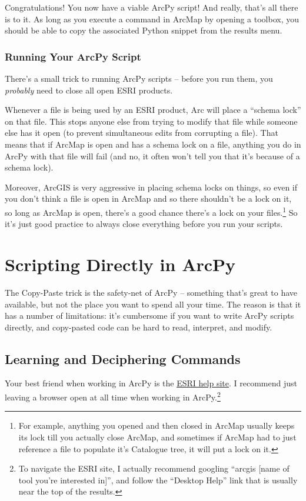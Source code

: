 \documentclass[12pt]{article}
\begin{document}
Congratulations! You now have a viable ArcPy script! And really, that's all there is to it. As long as you execute a command in ArcMap by opening a toolbox, you should be able to copy the associated Python snippet from the results menu. 

\subsubsection*{Running Your ArcPy Script}
There's a small trick to running ArcPy scripts -- before you run them, you \emph{probably} need to close all open ESRI products. 

Whenever a file is being used by an ESRI product, Arc will place a ``schema lock'' on that file. This stops anyone else from trying to modify that file while someone else has it open (to prevent simultaneous edits from corrupting a file). That means that if ArcMap is open and has a schema lock on a file, anything you do in ArcPy with that file will fail (and no, it often won't tell you that it's because of a schema lock).

Moreover, ArcGIS is very aggressive in placing schema locks on things, so even if you don't think a file is open in ArcMap and so there shouldn't be a lock on it, so long as ArcMap is open, there's a good chance there's a lock on your files.\footnote{For example, anything you opened and then closed in ArcMap usually keeps its lock till you actually close ArcMap, and sometimes if ArcMap had to just reference a file to populate it's Catalogue tree, it will put a lock on it.} So it's just good practice to always close everything before you run your scripts. 
 
\pagebreak
\section{Scripting Directly in ArcPy}
The Copy-Paste trick is the safety-net of ArcPy -- something that's great to have available, but not the place you want to spend all your time. The reason is that it has a number of limitations: it's cumbersome if you want to write ArcPy scripts directly, and copy-pasted code can be hard to read, interpret, and modify. 

\subsection*{Learning and Deciphering Commands}
Your best friend when working in ArcPy is the \href{http://help.arcgis.com/en/arcgisdesktop/10.0/help/index.html}{\underline{ESRI help site}}. I recommend just leaving a browser open at all time when working in ArcPy.\footnote{To navigate the ESRI site, I actually recommend googling ``arcgis [name of tool you're interested in]'', and follow the ``Desktop Help'' link that is usually near the top of the results.}
\end{document}
